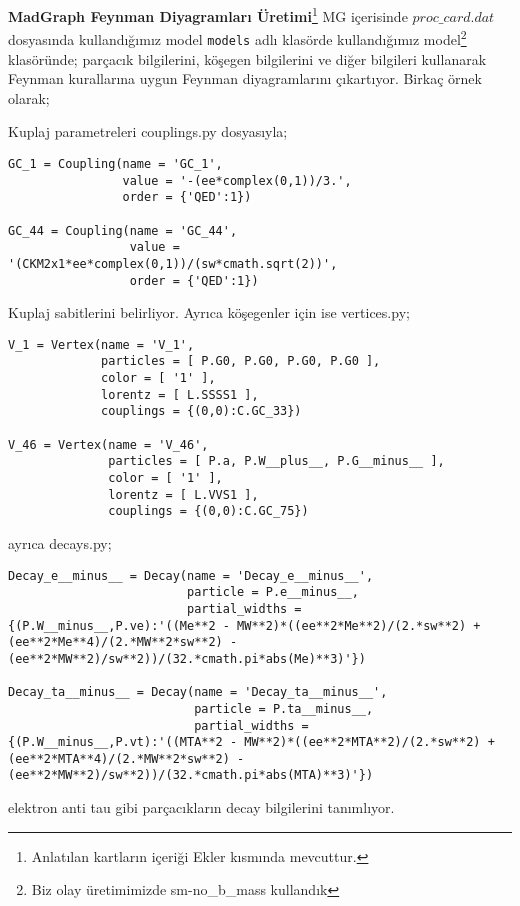 \par \textbf{MadGraph Feynman Diyagramları Üretimi}\footnote{Anlatılan kartların içeriği Ekler kısmında mevcuttur.}
MG içerisinde $proc\_card.dat$ dosyasında kullandığımız model \texttt{models} adlı klasörde kullandığımız model\footnote{Biz olay üretimimizde sm-no\_b\_mass kullandık} klasöründe; parçacık bilgilerini, köşegen bilgilerini ve diğer bilgileri kullanarak Feynman kurallarına uygun Feynman diyagramlarını çıkartıyor. Birkaç örnek olarak;

Kuplaj parametreleri couplings.py dosyasıyla;
\begin{lstlisting}
GC_1 = Coupling(name = 'GC_1',
                value = '-(ee*complex(0,1))/3.',
                order = {'QED':1})
                
GC_44 = Coupling(name = 'GC_44',
                 value = '(CKM2x1*ee*complex(0,1))/(sw*cmath.sqrt(2))',
                 order = {'QED':1})
\end{lstlisting}
Kuplaj sabitlerini belirliyor. Ayrıca köşegenler için ise vertices.py;
\begin{lstlisting}
V_1 = Vertex(name = 'V_1',
             particles = [ P.G0, P.G0, P.G0, P.G0 ],
             color = [ '1' ],
             lorentz = [ L.SSSS1 ],
             couplings = {(0,0):C.GC_33})
             
V_46 = Vertex(name = 'V_46',
              particles = [ P.a, P.W__plus__, P.G__minus__ ],
              color = [ '1' ],
              lorentz = [ L.VVS1 ],
              couplings = {(0,0):C.GC_75})
\end{lstlisting}
ayrıca decays.py;
\begin{lstlisting}
Decay_e__minus__ = Decay(name = 'Decay_e__minus__',
                         particle = P.e__minus__,
                         partial_widths = {(P.W__minus__,P.ve):'((Me**2 - MW**2)*((ee**2*Me**2)/(2.*sw**2) + (ee**2*Me**4)/(2.*MW**2*sw**2) - (ee**2*MW**2)/sw**2))/(32.*cmath.pi*abs(Me)**3)'})
                         
Decay_ta__minus__ = Decay(name = 'Decay_ta__minus__',
                          particle = P.ta__minus__,
                          partial_widths = {(P.W__minus__,P.vt):'((MTA**2 - MW**2)*((ee**2*MTA**2)/(2.*sw**2) + (ee**2*MTA**4)/(2.*MW**2*sw**2) - (ee**2*MW**2)/sw**2))/(32.*cmath.pi*abs(MTA)**3)'})

\end{lstlisting}
elektron anti tau gibi parçacıkların decay bilgilerini tanımlıyor.\\

